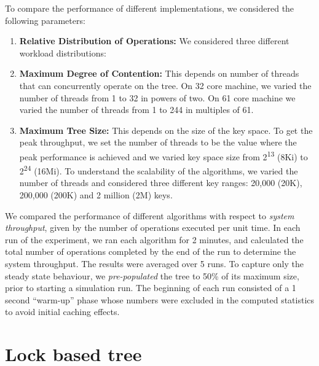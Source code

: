 To compare the performance of different implementations, we considered the following parameters:
\begin{enumerate}[leftmargin=*, noitemsep]
\item \textbf{Relative Distribution of Operations:} We considered three different workload  distributions: 
\item \textbf{Maximum Degree of Contention:} This depends on number of threads that can concurrently operate on the tree. On 32 core machine, we varied the number of threads 
from 1 to 32 in powers of two. On 61 core machine we varied the number of threads from 1 to 244 in multiples of 61.
\item \textbf{Maximum Tree Size:} This depends on the size of the key space. To get the peak throughput, we set the number of threads to be the value where the peak performance is achieved and we varied key space size from 2\textsuperscript{13} (8Ki) to 2\textsuperscript{24} (16Mi).  To understand the scalability of the algorithms, we varied the number of threads and considered three different key ranges: 20,000 (20K), 200,000 (200K) and 2 million (2M) keys.
\end{enumerate}

We compared the performance of different algorithms with respect to \emph{system throughput}, given by the number of operations executed per unit time. In each run of the experiment, we ran each algorithm for 2 minutes, and calculated the total number of operations completed by the end of the run to determine the system throughput. The results were averaged over 5 runs. To capture only the steady state behaviour, we \textit{pre-populated} the tree to 50\% of its maximum size, prior to starting a simulation run. The beginning of each run consisted of a 1 second ``warm-up'' phase whose numbers were excluded in the computed statistics to avoid initial caching effects. 

\section{Lock based tree}
\label{sec:experiments:castle}

